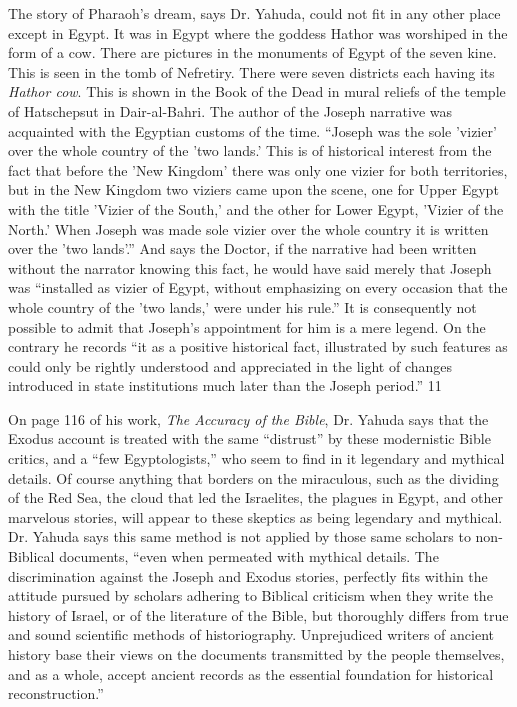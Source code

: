 The story of Pharaoh's dream, says Dr. Yahuda, could not fit in any other place except in
Egypt. It was in Egypt where the goddess Hathor was worshiped in the form of a cow. There
are pictures in the monuments of Egypt of the seven kine. This is seen in the tomb of
Nefretiry. There were seven districts each having its \textit{Hathor cow}. This is shown in the Book
of the Dead in mural reliefs of the temple of Hatschepsut in Dair-al-Bahri. The author of the
Joseph narrative was acquainted with the Egyptian customs of the time. ``Joseph was the sole
'vizier' over the whole country of the 'two lands.' This is of historical interest from the fact
that before the 'New Kingdom' there was only one vizier for both territories, but in the New
Kingdom two viziers came upon the scene, one for Upper Egypt with the title 'Vizier of the
South,' and the other for Lower Egypt, 'Vizier of the North.' When Joseph was made sole
vizier over the whole country it is written over the 'two lands'.'' And says the Doctor, if the
narrative had been written without the narrator knowing this fact, he would have said merely
that Joseph was ``installed as vizier of Egypt, without emphasizing on every occasion that the
whole country of the 'two lands,' were under his rule.'' It is consequently not possible to admit
that Joseph's appointment for him is a mere legend. On the contrary he records ``it as a
positive historical fact, illustrated by such features as could only be rightly understood and
appreciated in the light of changes introduced in state institutions much later than the Joseph
period.'' 11

On page 116 of his work, \textit{The Accuracy of the Bible}, Dr. Yahuda says that the Exodus
account is treated with the same ``distrust'' by these modernistic Bible critics, and a ``few
Egyptologists,'' who seem to find in it legendary and mythical details. Of course anything
that borders on the miraculous, such as the dividing of the Red Sea, the cloud that led the
Israelites, the plagues in Egypt, and other marvelous stories, will appear to these skeptics as
being legendary and mythical. Dr. Yahuda says this same method is not applied by those
same scholars to non-Biblical documents, ``even when permeated with mythical details. The
discrimination against the Joseph and Exodus stories, perfectly fits within the attitude
pursued by scholars adhering to Biblical criticism when they write the history of Israel, or of
the literature of the Bible, but thoroughly differs from true and sound scientific methods of
historiography. Unprejudiced writers of ancient history base their views on the documents
transmitted by the people themselves, and as a whole, accept ancient records as the essential
foundation for historical reconstruction.''

